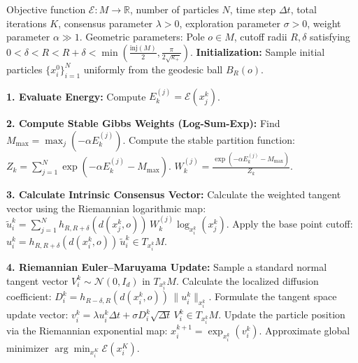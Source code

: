 \documentclass[11pt]{amsart}
\newcommand{\p}{o}%
\newcommand{\dist}{d}%
\newcommand{\inj}{\mathrm{inj}}%
\begin{document}
\begin{algorithm}[htbp]%
\caption{Intrinsic Consensus-Based Optimization on Manifolds (with Stable Gibbs Weights)}
\label{alg: CBO_manifold}
\begin{algorithmic}
\REQUIRE Objective function $\mathcal{E}: M \to \mathbb{R}$, number of particles $N$, time step $\Delta t$, total iterations $K$, consensus parameter $\lambda > 0$, exploration parameter $\sigma > 0$, weight parameter $\alpha \gg 1$.
\REQUIRE Geometric parameters: Pole $\p \in M$, cutoff radii $R, \delta$ satisfying $0 < \delta < R < R+\delta < \min\left(\frac{\inj(M)}{2},\frac{\pi}{2\sqrt{\kappa_+}}\right)$.
\STATE \textbf{Initialization:} Sample initial particles $\{x_i^0\}_{i=1}^N$ uniformly from the geodesic ball $B_R(\p)$.

    \STATE \textbf{1. Evaluate Energy:}
        \STATE Compute $E_k^{(j)} = \mathcal{E}(x_j^k)$.
    \ENDFOR

    \STATE \textbf{2. Compute Stable Gibbs Weights (Log-Sum-Exp):}
    \STATE Find $M_{\max} = \max_j (-\alpha E_k^{(j)})$.
    \STATE Compute the stable partition function: $Z_k = \sum_{j=1}^N \exp(-\alpha E_k^{(j)} - M_{\max})$.
        \STATE $W_k^{(j)} = \frac{\exp(-\alpha E_k^{(j)} - M_{\max})}{Z_k}$.
    \ENDFOR

    \STATE \textbf{3. Calculate Intrinsic Consensus Vector:}
        \STATE Calculate the weighted tangent vector using the Riemannian logarithmic map:
        \STATE $\displaystyle \tilde{u}_i^k = \sum_{j=1}^N h_{R, R+\delta}(\dist(x_j^k, \p)) \, W_k^{(j)} \log_{x_i^k}(x_j^k)$.
        \STATE Apply the base point cutoff:
        \STATE $u_i^k = h_{R, R+\delta}(\dist(x_i^k, \p)) \, \tilde{u}_i^k \in T_{x_i^k}M$.
    \ENDFOR

    \STATE \textbf{4. Riemannian Euler--Maruyama Update:}
        \STATE Sample a standard normal tangent vector $V_i^k \sim \mathcal{N}(0, I_d)$ in $T_{x_i^k}M$.
        \STATE Calculate the localized diffusion coefficient:
        \STATE $D_i^k =  h_{R-\delta, R}(\dist(x_i^k, \p)) \, \|u_i^k\|_{x_i^k}$.
        \STATE Formulate the tangent space update vector:
        \STATE $v_i^k = \lambda u_i^k \Delta t + \sigma D_i^k \sqrt{\Delta t} \, V_i^k \in T_{x_i^k}M$.
        \STATE Update the particle position via the Riemannian exponential map:
        \STATE $x_i^{k+1} = \exp_{x_i^k}(v_i^k)$.
    \ENDFOR
\ENDFOR
\RETURN Approximate global minimizer $\arg\min_{x_i^K} \mathcal{E}(x_i^K)$.
\end{algorithmic}
\end{algorithm}
\end{document}
